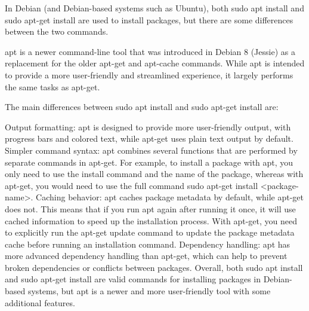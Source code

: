 In Debian (and Debian-based systems such as Ubuntu), both sudo apt install and sudo apt-get install are used to install packages, but there are some differences between the two commands.

apt is a newer command-line tool that was introduced in Debian 8 (Jessie) as a replacement for the older apt-get and apt-cache commands. While apt is intended to provide a more user-friendly and streamlined experience, it largely performs the same tasks as apt-get.

The main differences between sudo apt install and sudo apt-get install are:

Output formatting: apt is designed to provide more user-friendly output, with progress bars and colored text, while apt-get uses plain text output by default.
Simpler command syntax: apt combines several functions that are performed by separate commands in apt-get. For example, to install a package with apt, you only need to use the install command and the name of the package, whereas with apt-get, you would need to use the full command sudo apt-get install <package-name>.
Caching behavior: apt caches package metadata by default, while apt-get does not. This means that if you run apt again after running it once, it will use cached information to speed up the installation process. With apt-get, you need to explicitly run the apt-get update command to update the package metadata cache before running an installation command.
Dependency handling: apt has more advanced dependency handling than apt-get, which can help to prevent broken dependencies or conflicts between packages.
Overall, both sudo apt install and sudo apt-get install are valid commands for installing packages in Debian-based systems, but apt is a newer and more user-friendly tool with some additional features.
